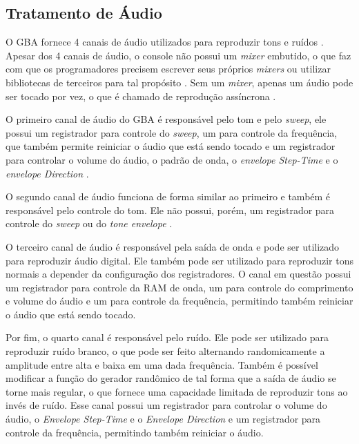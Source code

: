 \subsection{Tratamento de Áudio}

O GBA fornece 4 canais de áudio utilizados para reproduzir tons e ruídos \cite{gbatek}. Apesar dos 4 canais de áudio, o console não possui um \textit{mixer} embutido, o que faz com que os programadores precisem escrever seus próprios \textit{mixers} ou utilizar bibliotecas de terceiros para tal propósito \cite{harbour}. Sem um \textit{mixer}, apenas um áudio pode ser tocado por vez, o que é chamado de reprodução assíncrona \cite{harbour}.

O primeiro canal de áudio do GBA é responsável pelo tom e pelo \textit{sweep}, ele possui um registrador para controle do \textit{sweep}, um para controle da frequência, que também permite reiniciar o áudio que está sendo tocado e um registrador para controlar o volume do áudio, o padrão de onda, o \textit{envelope Step-Time} e o \textit{envelope Direction} \cite{gbatek}.

O segundo canal de áudio funciona de forma similar ao primeiro e também é responsável pelo controle do tom. Ele não possui, porém, um registrador para controle do \textit{sweep} ou do \textit{tone envelope} \cite{gbatek}.

O terceiro canal de áudio é responsável pela saída de onda e pode ser utilizado para reproduzir áudio digital. Ele também pode ser utilizado para reproduzir tons normais a depender da configuração dos registradores. O canal em questão possui um registrador para controle da RAM de onda, um para controle do comprimento e volume do áudio e um para controle da frequência, permitindo também reiniciar o áudio que está sendo tocado.

Por fim, o quarto canal é responsável pelo ruído. Ele pode ser utilizado para reproduzir ruído branco, o que pode ser feito alternando randomicamente a amplitude entre alta e baixa em uma dada frequência. Também é possível modificar a função do gerador randômico de tal forma que a saída de áudio se torne mais regular, o que fornece uma capacidade limitada de reproduzir tons ao invés de ruído. Esse canal possui um registrador para controlar o volume do áudio, o \textit{Envelope Step-Time} e o \textit{Envelope Direction} e um registrador para controle da frequência, permitindo também reiniciar o áudio.
